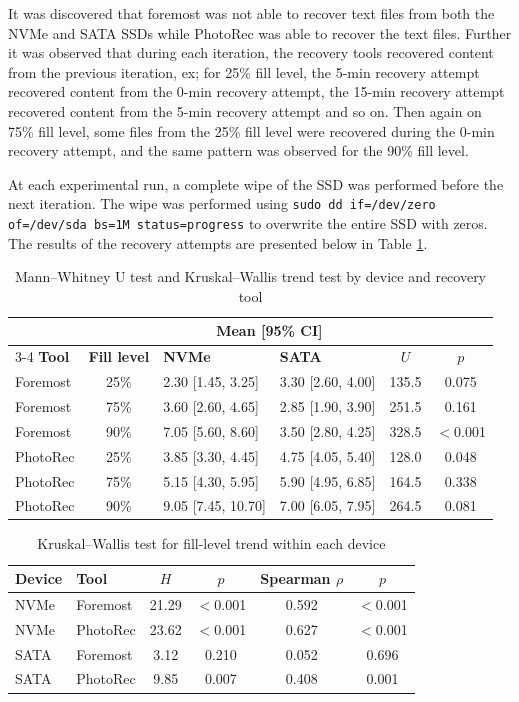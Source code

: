 It was discovered that foremost was not able to recover text files from both the NVMe and SATA SSDs while PhotoRec was able to recover the text files. Further it was 
observed that during each iteration, the recovery tools recovered content from the previous iteration, ex; for 25\% fill level, the 5-min recovery attempt recovered 
content from the 0-min recovery attempt, the 15-min recovery attempt recovered content from the 5-min recovery attempt and so on. Then again on 75\% fill level, some 
files from the 25\% fill level were recovered during the 0-min recovery attempt, and the same pattern was observed for the 90\% fill level. 

At each experimental run, a complete wipe of the SSD was performed before the next iteration. The wipe was performed using \texttt{sudo dd if=/dev/zero of=/dev/sda 
bs=1M status=progress} to overwrite the entire SSD with zeros. The results of the recovery attempts are presented below in Table \ref{tab:recovery-statistics}.

\begin{table}[h]
\centering
\caption{Mann--Whitney U test and Kruskal--Wallis trend test by device and recovery tool}
\label{tab:recovery-statistics}
\begin{tabular}{l c l l c c}
\toprule
 & & \multicolumn{2}{c}{\textbf{Mean [95\% CI]}} \\
\cmidrule(lr){3-4}
\textbf{Tool} & \textbf{Fill level} & \textbf{NVMe} & \textbf{SATA} & \textbf{$U$} & \textbf{$p$} \\
\midrule
Foremost & 25\% & 2.30 [1.45, 3.25] & 3.30 [2.60, 4.00] & 135.5 & 0.075 \\
Foremost & 75\% & 3.60 [2.60, 4.65] & 2.85 [1.90, 3.90] & 251.5 & 0.161 \\
Foremost & 90\% & 7.05 [5.60, 8.60] & 3.50 [2.80, 4.25] & 328.5 & $<$0.001 \\
PhotoRec & 25\% & 3.85 [3.30, 4.45] & 4.75 [4.05, 5.40] & 128.0 & 0.048 \\
PhotoRec & 75\% & 5.15 [4.30, 5.95] & 5.90 [4.95, 6.85] & 164.5 & 0.338 \\
PhotoRec & 90\% & 9.05 [7.45, 10.70] & 7.00 [6.05, 7.95] & 264.5 & 0.081 \\
\bottomrule
\end{tabular}
\end{table}

\begin{table}[h]
\centering
\caption{Kruskal--Wallis test for fill-level trend within each device}
\label{tab:kruskal-wallis}
\begin{tabular}{llcccc}
\toprule
\textbf{Device} & \textbf{Tool} & \textbf{$H$} & \textbf{$p$} & \textbf{Spearman $\rho$} & \textbf{$p$} \\
\midrule
NVMe & Foremost & 21.29 & $<$0.001 & 0.592 & $<$0.001 \\
NVMe & PhotoRec & 23.62 & $<$0.001 & 0.627 & $<$0.001 \\
SATA & Foremost & 3.12 & 0.210 & 0.052 & 0.696 \\
SATA & PhotoRec & 9.85 & 0.007 & 0.408 & 0.001 \\
\bottomrule
\end{tabular}
\end{table}

